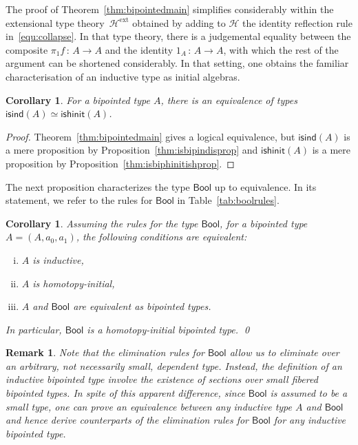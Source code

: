 \documentclass[10pt,a4paper,oneside,reqno]{amsart}
\numberwithin{equation}{section}
\theoremstyle{mythm}
\newtheorem{corollary}[theorem]{Corollary}
\theoremstyle{mydef}
\theoremstyle{myrmk}
\newtheorem{remark}[theorem]{Remark}
\newcommand{\ie}{\text{i.e.\ }}
\newcommand{\co}{\,{:}\,}
\newcommand{\Hint}{\mathcal{H}}
\newcommand{\Hext}{\mathcal{H}^{\mathrm{ext}}}
\newcommand{\isbipind}{\mathsf{isind}}
\newcommand{\isbiphinit}{\mathsf{ishinit}}
\newcommand{\Bool}{\mathsf{Bool}}
\begin{document}
The proof of Theorem~\ref{thm:bipointedmain} simplifies considerably within the extensional
type theory~$\Hext$ obtained by adding to $\Hint$ the identity reflection rule in~\eqref{equ:collapse}. In that type theory, 
there is a judgemental equality 
between the composite $\pi_1 f \co A \to A$ and the identity $1_A \co A \to A$, with which the
rest of the argument can be shortened considerably. In that setting, one obtains the familiar characterisation 
of an inductive type as initial algebras.

\begin{corollary} For a bipointed type $A$, there is an equivalence of types $\isbipind(A)\simeq   \isbiphinit(A)$.
\end{corollary} 

\begin{proof} Theorem~\ref{thm:bipointedmain} gives a logical equivalence, but  $\isbipind(A)$ is a 
mere proposition by Proposition~\ref{thm:isbipindisprop} and $\isbiphinit(A)$ is a mere proposition
by Proposition~\ref{thm:isbiphinitishprop}. 
\end{proof}

The next proposition characterizes the
type $\Bool$ up to equivalence. In its statement, we refer to the rules for $\Bool$ in
Table~\ref{tab:boolrules}.



\begin{corollary} Assuming the rules for the type $\Bool$, for a bipointed type $A = (A, a_0, a_1)$, the following 
conditions are equivalent:
\begin{enumerate}[(i)]
\item $A$ is inductive,
\item $A$ is homotopy-initial,
\item $A$ and $\Bool$ are equivalent as bipointed types.
\end{enumerate}
In particular, $\Bool$ is a homotopy-initial bipointed type. \qed
\end{corollary}



\begin{remark} \label{thm:smallelimination} Note that the elimination rules for $\Bool$ allow us to eliminate 
over an arbitrary, \ie not necessarily small, dependent type. Instead, the definition of an inductive bipointed
type involve the existence of sections over small fibered bipointed types. In spite of this apparent difference,
since $\Bool$ is assumed to be a small type, one can prove an equivalence between any inductive type $A$
and $\Bool$ and hence derive counterparts of the elimination rules for $\Bool$ for any inductive bipointed type. 
\end{remark} 
\end{document}
